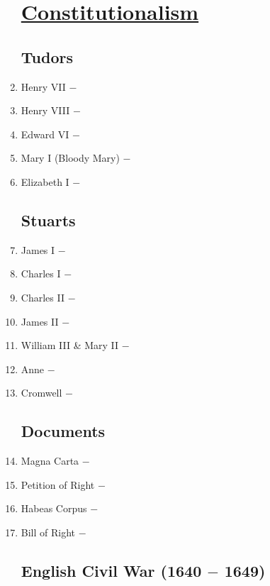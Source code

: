 \documentclass[12pt]{article}
\begin{document}
\begin{enumerate}
\section{\underline{Constitutionalism}}

\subsection{Tudors}

\item Henry VII $-$ 

\item Henry VIII $-$ 

\item Edward VI $-$ 

\item Mary I (Bloody Mary) $-$ 

\item Elizabeth I $-$ 

\subsection{Stuarts}

\item James I $-$ 

\item Charles I $-$ 

\item Charles II $-$

\item James II $-$ 

\item William III \& Mary II $-$

\item Anne $-$ 

\item Cromwell $-$ 

\subsection{Documents}

\item Magna Carta $-$ 

\item Petition of Right $-$ 

\item Habeas Corpus $-$ 

\item Bill of Right $-$ 

\subsection{English Civil War (1640 $-$ 1649)}


\end{enumerate}
\end{document}
